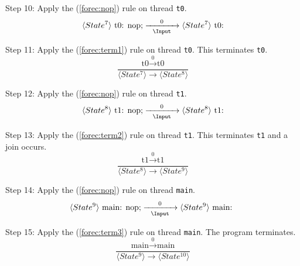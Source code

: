 \noindent
Step 10: Apply the (\ref{forec:nop}) rule on thread \verb$t0$.
\begin{equation*}
	\langle State^7 \rangle ~ \text{t0: nop;}
		\xrightarrow[~~\Input~~]{~~0~~} 
	\langle State^7 \rangle ~ \text{t0:}
\end{equation*}

\noindent
Step 11: Apply the (\ref{forec:term1}) rule on thread \verb$t0$. 
This terminates \verb$t0$.
\begin{equation*}
	\frac{
			\text{t0} \xrightarrow{~~0~~} \text{t0}
		}{
			\langle State^7 \rangle \xrightarrow{~~~~~} \langle State^8 \rangle
		}
\end{equation*}

\noindent
Step 12: Apply the (\ref{forec:nop}) rule on thread \verb$t1$.
\begin{equation*}
	\langle State^8 \rangle ~ \text{t1: nop;}
		\xrightarrow[~~\Input~~]{~~0~~} 
	\langle State^8 \rangle ~ \text{t1:}
\end{equation*}

\noindent
Step 13: Apply the (\ref{forec:term2}) rule on thread \verb$t1$.
This terminates \verb$t1$ and a join occurs.
\begin{equation*}
	\frac{
			\text{t1} \xrightarrow{~~0~~} \text{t1}
		}{
			\langle State^8 \rangle \xrightarrow{~~~~~} \langle State^9 \rangle
		}
\end{equation*}

\noindent
Step 14: Apply the (\ref{forec:nop}) rule on thread \verb$main$.
\begin{equation*}
	\langle State^9 \rangle ~ \text{main: nop;}
		\xrightarrow[~~\Input~~]{~~0~~} 
	\langle State^9 \rangle ~ \text{main: }
\end{equation*}

\noindent
Step 15: Apply the (\ref{forec:term3}) rule on thread \verb$main$.
The program terminates.
\begin{equation*}
	\frac{
			\text{main} \xrightarrow{~~0~~} \text{main}
		}{
			\langle State^9 \rangle \xrightarrow{~~~~~} \langle State^{10} \rangle
		}
\end{equation*}
